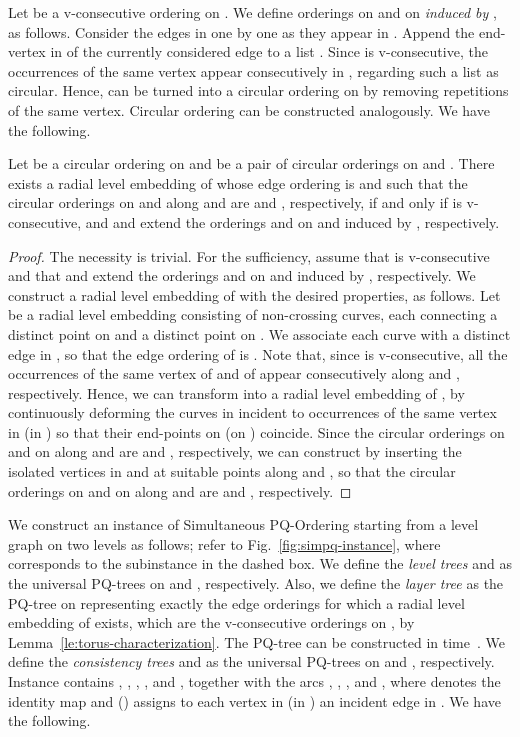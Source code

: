 \documentclass{llncs}
\begin{document}
Let  be a v-consecutive ordering on . 
We define orderings  on  and  on  {\em induced by} , as follows.
Consider the edges in  one by one as they appear in . Append the end-vertex in  of the currently considered edge to a list . 
Since  is v-consecutive, the occurrences of the same vertex appear consecutively in , regarding such a list as circular.
Hence,  can be turned into a circular ordering  on  by removing repetitions of the same vertex. Circular ordering  can be constructed analogously. We have the following.


\begin{lemma}\label{le:torus-characterization}
Let  be a circular ordering on  and  be a pair of circular orderings on  and . 
There exists a radial level embedding of  whose edge ordering is  and such that the circular orderings on  and  along  and  are  and , respectively,
if and only if  is v-consecutive, and  and  extend the orderings  and  on  and  induced by , respectively.
\end{lemma}

\begin{proof}
The necessity is trivial. 
For the sufficiency, assume that  is v-consecutive and that  and  extend the orderings  and  on  and  induced by , respectively.
We construct a radial level embedding  of  with the desired properties, as follows. Let  be a radial level embedding consisting of  non-crossing curves, each connecting a distinct point on  and a distinct point on . We associate each curve with a distinct edge in , so that the edge ordering of  is . Note that, since  is v-consecutive, all the occurrences of the same vertex of  and of  appear consecutively along  and , respectively. Hence, we can transform  into a radial level embedding  of
, by continuously deforming the curves in  incident to occurrences of the same vertex in  (in ) so that their end-points on  (on ) coincide. Since the circular orderings on  and on  along  and  are  and , respectively, we can construct  by inserting the isolated vertices in  and  at suitable points along  and , so that the circular orderings on  and on  along  and  are  and , respectively.
\end{proof}


We construct an instance  of {\sc Simultaneous PQ-Ordering} starting from a level graph  on two levels as follows; refer to Fig.~\ref{fig:simpq-instance}, where  corresponds to the subinstance  in the dashed box.
We define the {\em level trees}  and  as the universal PQ-trees on  and , respectively. 
Also, we define the {\em layer tree}  as the PQ-tree on  representing exactly the edge orderings for which a radial level embedding of  exists, which are the v-consecutive orderings on , by Lemma~\ref{le:torus-characterization}. 
The PQ-tree  can be constructed in  time~\cite{bl-tcop-76,hm-ppp-04}.
We define the {\em consistency trees}  and  as the universal PQ-trees on  and , respectively.
Instance  contains , , , , and , together with the arcs ,
,
,
 and , where  denotes the identity map and   () assigns to each vertex in  (in ) an incident edge in . We have the following.
\end{document}
